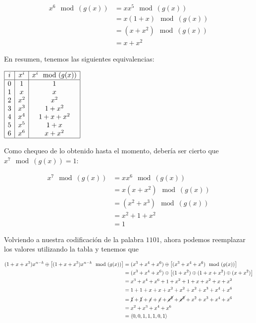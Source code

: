 \documentclass[10pt,a4paper]{article}
\begin{document}
\begin{center}
\begin{align*} x^6 \mod (g(x)) &= xx^5 \mod(g(x))\\ &= x(1+x ) \mod (g(x))\\ &= (x + x^2) \mod (g(x))\\ &= x + x^ 2 \end{align*}
\end{center}

En resumen, tenemos las siguientes equivalencias:

\begin{center}
$\begin{array}{|c|c|c|} \hline i & x^i & x^i \mod (g(x))\\ \hline 0 & 1 & 1\\ 1 & x & x \\ 2 & x^2 & x^2 \\ 3 & x^3 & 1 + x^2 \\ 4 & x^4 & 1 + x + x^2\\ 5 & x^5 & 1+ x\\ 6 & x^6 & x+x^2\\ \hline \end{array}$
\end{center}

Como chequeo de lo obtenido hasta el momento, debería ser cierto que $x^7 \mod(g(x)) = 1$:

\begin{center}
\begin{align*} x^7 \mod (g(x)) &= xx^6\mod(g(x))\\ &= x(x+x^2 ) \mod (g(x))\\ &= (x^2 + x^3) \mod (g(x))\\ &= x^2 + 1 + x^ 2\\ &= 1 \end{align*}
\end{center}

Volviendo a nuestra codificación de la palabra $1101$, ahora podemos reemplazar los valores utilizando la tabla y tenemos que

\begin{center}
\begin{align*} (1+x+x^3)x^{n-k}\oplus\left[(1+x+x^3)x^{n-k} \mod (g(x))\right] &=(x^3+x^4+x^6)\oplus\left[(x^3+x^4+x^6) \mod (g(x)) \right]\\ &=(x^3+x^4+x^6)\oplus\left[(1 + x^2)\oplus(1+x+ x^2) \oplus(x+x^2) \right]\\ &=x^3 + x^4 + x^6 + 1 + x^2 + 1 + x + x^2 + x + x^2 \\ &=1 + 1 + x + x + x^2 + x^2 + x^2+ x^3 + x^4 + x^6 \\ &=\cancel{1} + \cancel{1} + \cancel{x} + \cancel{x} + \cancel{x^2} + \cancel{x^2} + x^2+ x^3 + x^4 + x^6 \\ &= x^2 + x^3+ x^4 + x^6\\ &= \langle 0, 0, 1, 1, 1, 0 , 1\rangle \end{align*}
\end{center}
\end{document}
